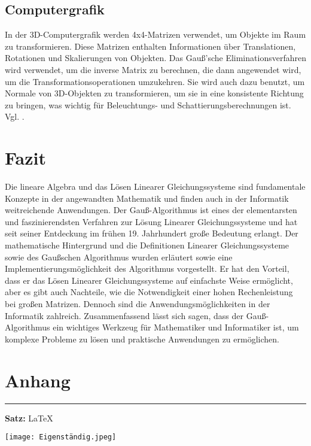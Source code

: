 \documentclass[a4paper, 12pt]{report}
\newcommand{\GA}{Gauß-Algorithmus }
\begin{document}
\section{Computergrafik}
In der 3D-Computergrafik werden 4x4-Matrizen verwendet, um Objekte im Raum zu transformieren.
Diese Matrizen enthalten Informationen über Translationen, Rotationen und Skalierungen von Objekten.
Das Gauß'sche Eliminationsverfahren wird verwendet, um die inverse Matrix zu berechnen, die dann angewendet wird,
um die Transformationsoperationen umzukehren. Sie wird auch dazu benutzt, um Normale von 3D-Objekten zu transformieren,
um sie in eine konsistente Richtung zu bringen, was wichtig für Beleuchtungs- und Schattierungsberechnungen ist. Vgl. \cite{6}.

{\let\clearpage\relax \chapter{Fazit}}
Die lineare Algebra und das Lösen Linearer Gleichungssysteme sind fundamentale Konzepte in der angewandten Mathematik
und finden auch in der Informatik weitreichende Anwendungen. Der \GA  ist eines der elementarsten und faszinierendsten Verfahren
zur Lösung Linearer Gleichungssysteme und hat seit seiner Entdeckung im frühen 19. Jahrhundert große Bedeutung erlangt.
Der mathematische Hintergrund und die Definitionen Linearer Gleichungssysteme sowie des Gaußschen Algorithmus wurden
erläutert sowie eine Implementierungsmöglichkeit des Algorithmus vorgestellt.
Er hat den Vorteil, dass er das Lösen Linearer Gleichungssysteme auf einfachste Weise ermöglicht,
aber es gibt auch Nachteile, wie die Notwendigkeit einer hohen Rechenleistung bei großen Matrizen.
Dennoch sind die Anwendungsmöglichkeiten in der Informatik zahlreich.
Zusammenfassend lässt sich sagen, dass der \GA  ein wichtiges Werkzeug für
Mathematiker und Informatiker ist, um komplexe Probleme zu lösen und praktische Anwendungen zu ermöglichen.


{\let\clearpage\relax\chapter*{Anhang}}
\footnotesize

\printbibliography
\vspace*{\fill}
\vspace*{5pt}
\hrule
\vspace{5pt}
\begin{normalsize}
    \textbf{Satz:}
    \LaTeX
\end{normalsize}
\newpage
\texttt{[image: Eigenständig.jpeg]}
\end{document}
